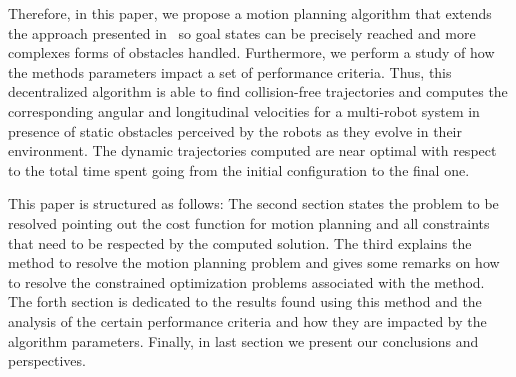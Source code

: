 \documentclass[eprint]{actapoly}
\begin{document}
 


Therefore, in this paper, we propose a motion planning algorithm that extends 
the approach presented in~\cite{Defoort2009} so goal states can be precisely
reached and more complexes forms of obstacles handled. Furthermore, we perform a study 
of how the methods parameters impact a set of performance criteria.
Thus, this decentralized algorithm is able to find collision-free trajectories and 
computes the corresponding
angular and longitudinal velocities for a multi-robot system in 
presence of static obstacles perceived by the robots as they evolve 
in their environment. The dynamic trajectories computed are near optimal with 
respect to the total time spent going from the initial configuration to the 
final one.




 


This paper is structured as follows: The second section states the problem to
be resolved pointing out the cost function for motion planning and all constraints
that need to be respected by the computed solution.
The third explains the method to resolve the motion planning problem and gives
some remarks on how to resolve the constrained optimization problems associated
with the method.
The forth section is dedicated to the results found using
this method and the analysis of the certain performance criteria and 
how they are impacted by the algorithm parameters.
Finally, in last section we present our conclusions and perspectives.
\end{document}

